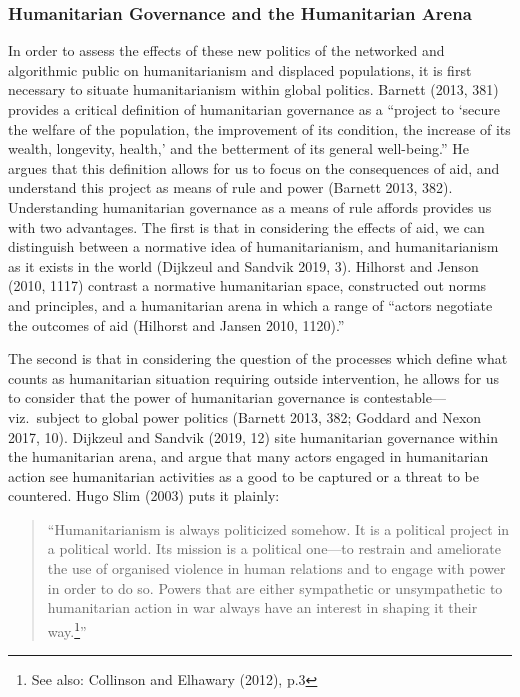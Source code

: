 \documentclass[
]{article}
\begin{document}
\hypertarget{humanitarian-governance-and-the-humanitarian-arena}{%
\subsubsection{Humanitarian Governance and the Humanitarian
Arena}\label{humanitarian-governance-and-the-humanitarian-arena}}

In order to assess the effects of these new politics of the networked
and algorithmic public on humanitarianism and displaced populations, it
is first necessary to situate humanitarianism within global politics.
Barnett (2013, 381) provides a critical definition of humanitarian
governance as a ``project to `secure the welfare of the population, the
improvement of its condition, the increase of its wealth, longevity,
health,' and the betterment of its general well-being.'' He argues that
this definition allows for us to focus on the consequences of aid, and
understand this project as means of rule and power (Barnett 2013, 382).
Understanding humanitarian governance as a means of rule affords
provides us with two advantages. The first is that in considering the
effects of aid, we can distinguish between a normative idea of
humanitarianism, and humanitarianism as it exists in the world (Dijkzeul
and Sandvik 2019, 3). Hilhorst and Jenson (2010, 1117) contrast a
normative humanitarian space, constructed out norms and principles, and
a humanitarian arena in which a range of ``actors negotiate the outcomes
of aid (Hilhorst and Jansen 2010, 1120).''

The second is that in considering the question of the processes which
define what counts as humanitarian situation requiring outside
intervention, he allows for us to consider that the power of
humanitarian governance is contestable---viz.~subject to global power
politics (Barnett 2013, 382; Goddard and Nexon 2017, 10). Dijkzeul and
Sandvik (2019, 12) site humanitarian governance within the humanitarian
arena, and argue that many actors engaged in humanitarian action see
humanitarian activities as a good to be captured or a threat to be
countered. Hugo Slim (2003) puts it plainly:

\begin{quote}
``Humanitarianism is always politicized somehow. It is a political
project in a political world. Its mission is a political one---to
restrain and ameliorate the use of organised violence in human relations
and to engage with power in order to do so. Powers that are either
sympathetic or unsympathetic to humanitarian action in war always have
an interest in shaping it their way.\footnote{See also: Collinson and
  Elhawary (2012), p.3}''
\end{quote}
\end{document}
